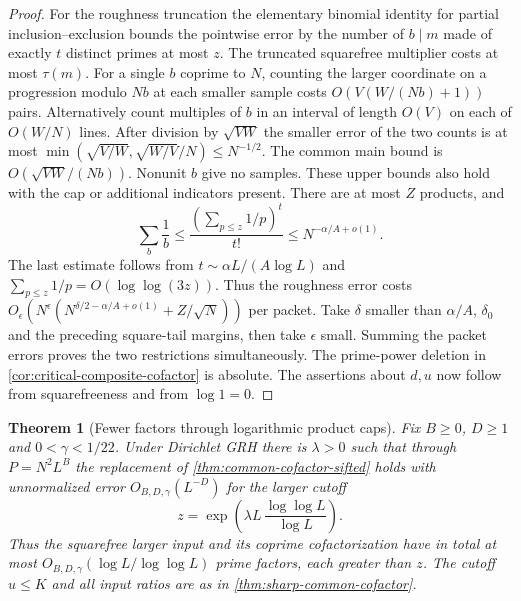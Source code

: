 \documentclass[11pt,a4paper]{article}
\numberwithin{equation}{section}
\newtheorem{theorem}{Theorem}[section]
\begin{document}
\begin{proof}
For the roughness truncation the elementary binomial identity
for partial inclusion--exclusion bounds the pointwise error by
the number of $b\mid m$ made of exactly $t$ distinct primes
at most $z$. The truncated squarefree multiplier costs at most
$\tau(m)$. For a single $b$ coprime to $N$, counting the larger
coordinate on a progression modulo $Nb$ at each smaller sample
costs $O(V(W/(Nb)+1))$ pairs. Alternatively count multiples of
$b$ in an interval of length $O(V)$ on each of $O(W/N)$ lines.
After division by $\sqrt{VW}$ the smaller error of the two
counts is at most
$\min(\sqrt{V/W},\sqrt{W/V}/N)\le N^{-1/2}$.
The common main bound is $O(\sqrt{VW}/(Nb))$.
Nonunit $b$ give no samples. These upper bounds also hold with
the cap or additional indicators present. There are at most $Z$
products, and
\[
 \sum_b\frac1b\le\frac{(\sum_{p\le z}1/p)^t}{t!}
        \le N^{-\alpha/A+o(1)}.
\]
The last estimate follows from $t\sim\alpha L/(A\log L)$
and $\sum_{p\le z}1/p=O(\log\log(3z))$. Thus the roughness
error costs $O_\epsilon(N^\epsilon(N^{\delta/2-\alpha/A+o(1)}
+Z/\sqrt N))$ per packet. Take $\delta$ smaller than
$\alpha/A$, $\delta_0$ and the preceding square-tail margins,
then take $\epsilon$ small. Summing the packet errors proves
the two restrictions simultaneously. The prime-power deletion
in \cref{cor:critical-composite-cofactor} is absolute. The
assertions about $d,u$ now follow from squarefreeness and from
$\log1=0$.
\end{proof}

\begin{theorem}[Fewer factors through logarithmic product caps]
\label{thm:common-cofactor-few-factors}
Fix $B\ge0$, $D\ge1$ and $0<\gamma<1/22$. Under Dirichlet GRH
there is $\lambda>0$ such that through $P=N^2 L^B$ the
replacement of \cref{thm:common-cofactor-sifted} holds with
unnormalized error $O_{B,D,\gamma}(L^{-D})$ for the larger cutoff
\[
 z=\exp\left(\lambda L\,\frac{\log\log L}{\log L}\right).
\]
Thus the squarefree larger input and its coprime cofactorization
have in total at most $O_{B,D,\gamma}(\log L/\log\log L)$ prime
factors, each greater than $z$. The cutoff $u\le K$ and all
input ratios are as in \cref{thm:sharp-common-cofactor}.
\end{theorem}
\end{document}
